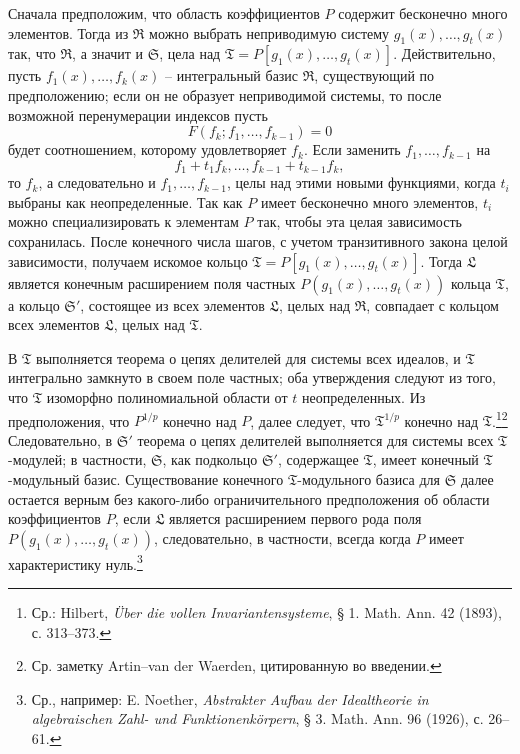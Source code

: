 \documentclass[11pt]{article}
\begin{document}
Сначала предположим, что область коэффициентов $P$ содержит бесконечно много элементов. Тогда из $\mathfrak R$ можно выбрать неприводимую систему $g_1(x),\ldots,g_t(x)$ так, что $\mathfrak R$, а значит и $\mathfrak S$, цела над $\mathfrak T=P[g_1(x),\ldots,g_t(x)]$. Действительно, пусть $f_1(x),\ldots,f_k(x)$ -- интегральный базис $\mathfrak R$, существующий по предположению; если он не образует неприводимой системы, то после возможной перенумерации индексов пусть
\[
F(f_k;f_1,\ldots,f_{k-1})=0
\]
будет соотношением, которому удовлетворяет $f_k$. Если заменить $f_1,\ldots,f_{k-1}$ на
\[
 f_1+t_1f_k,\ldots,f_{k-1}+t_{k-1}f_k,
\]
то $f_k$, а следовательно и $f_1,\ldots,f_{k-1}$, целы над этими новыми функциями, когда $t_i$ выбраны как неопределенные. Так как $P$ имеет бесконечно много элементов, $t_i$ можно специализировать к элементам $P$ так, чтобы эта целая зависимость сохранилась. После конечного числа шагов, с учетом транзитивного закона целой зависимости, получаем искомое кольцо $\mathfrak T=P[g_1(x),\ldots,g_t(x)]$. Тогда $\mathfrak L$ является конечным расширением поля частных $P(g_1(x),\ldots,g_t(x))$ кольца $\mathfrak T$, а кольцо $\mathfrak S'$, состоящее из всех элементов $\mathfrak L$, целых над $\mathfrak R$, совпадает с кольцом всех элементов $\mathfrak L$, целых над $\mathfrak T$.

В $\mathfrak T$ выполняется теорема о цепях делителей для системы всех идеалов, и $\mathfrak T$ интегрально замкнуто в своем поле частных; оба утверждения следуют из того, что $\mathfrak T$ изоморфно полиномиальной области от $t$ неопределенных. Из предположения, что $P^{1/p}$ конечно над $P$, далее следует, что $\mathfrak T^{1/p}$ конечно над $\mathfrak T$.\footnote{Ср.: Hilbert, \emph{Über die vollen Invariantensysteme}, § 1. Math. Ann. 42 (1893), с. 313--373.}\footnote{Ср. заметку Artin--van der Waerden, цитированную во введении.} Следовательно, в $\mathfrak S'$ теорема о цепях делителей выполняется для системы всех $\mathfrak T$-модулей; в частности, $\mathfrak S$, как подкольцо $\mathfrak S'$, содержащее $\mathfrak T$, имеет конечный $\mathfrak T$-модульный базис. Существование конечного $\mathfrak T$-модульного базиса для $\mathfrak S$ далее остается верным без какого-либо ограничительного предположения об области коэффициентов $P$, если $\mathfrak L$ является расширением первого рода поля $P(g_1(x),\ldots,g_t(x))$, следовательно, в частности, всегда когда $P$ имеет характеристику нуль.\footnote{Ср., например: E. Noether, \emph{Abstrakter Aufbau der Idealtheorie in algebraischen Zahl- und Funktionenkörpern}, § 3. Math. Ann. 96 (1926), с. 26--61.}
\end{document}
